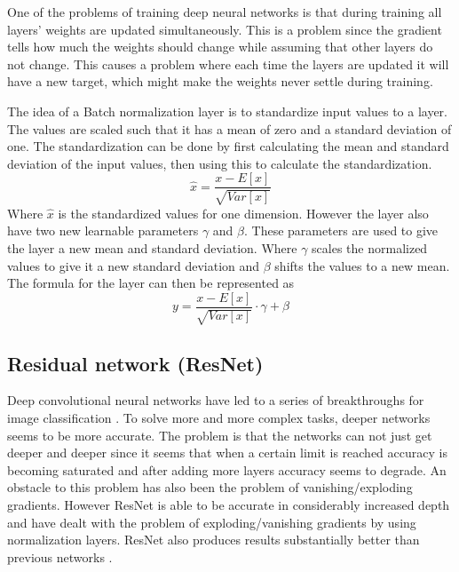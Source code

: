One of the problems of training deep neural networks is that during training all layers' weights are updated simultaneously.
This is a problem since the gradient tells how much the weights should change while assuming that other layers do not change.
This causes a problem where each time the layers are updated it will have a new target, which might make the weights never settle during training.

The idea of a Batch normalization layer is to standardize input values to a layer.
The values are scaled such that it has a mean of zero and a standard deviation of one.
The standardization can be done by first calculating the mean and standard deviation of the input values, then using this to calculate the standardization.
$$\hat{x} = \frac{x - E[x]}{\sqrt{Var[x]}}$$
Where $\hat{x}$ is the standardized values for one dimension.
However the layer also have two new learnable parameters $\gamma$ and $\beta$.
These parameters are used to give the layer a new mean and standard deviation.
Where $\gamma$ scales the normalized values to give it a new standard deviation and $\beta$ shifts the values to a new mean.
The formula for the layer can then be represented as
$$y = \frac{x - E[x]}{\sqrt{Var[x]}} \cdot \gamma + \beta$$


\subsection{Residual network (ResNet)}

Deep convolutional neural networks have led to a series of breakthroughs for image classification \cite{resnet}.
To solve more and more complex tasks, deeper networks seems to be more accurate.
The problem is that the networks can not just get deeper and deeper since it seems that when a certain limit is reached accuracy is becoming saturated and after adding more layers accuracy seems to degrade.
An obstacle to this problem has also been the problem of vanishing/exploding gradients.
However ResNet is able to be accurate in considerably increased depth and have dealt with the problem of exploding/vanishing gradients by using normalization layers. ResNet also produces results substantially better than previous networks \cite{resnet}.

